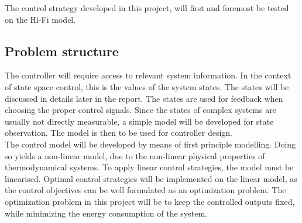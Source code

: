 The control strategy developed in this project, will first and foremost be tested on the Hi-Fi model. 




\subsection{Problem structure}

The controller will require access to relevant system information. In the context of state space control, this is the values of the system states. The states will be discussed in details later in the report. The states are used for feedback when choosing the proper control signals. Since the states of complex systems are usually not directly measurable, a simple model will be developed for state observation. The model is then to be used for controller design. \\

The control model will be developed by means of first principle modelling. Doing so yields a non-linear model, due to the non-linear physical properties of thermodynamical systems. To apply linear control strategies, the model must be linearised. Optimal control strategies will be implemented on the linear model, as the control objectives can be well formulated as an optimization problem. The optimization problem in this project will be to keep the controlled outputs fixed, while minimizing the energy consumption of the system.\\


		
